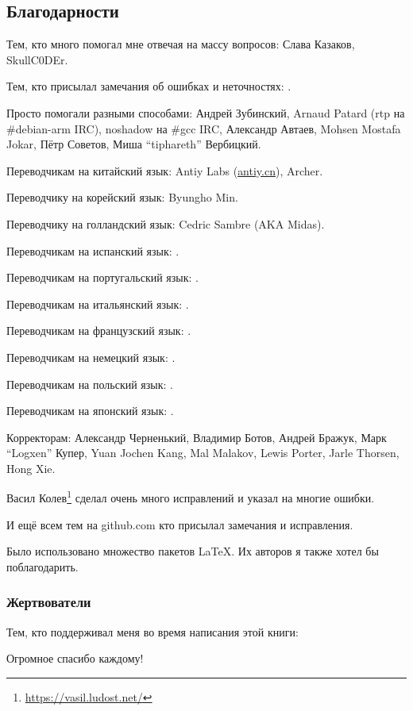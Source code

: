 \subsection*{Благодарности}

Тем, кто много помогал мне отвечая на массу вопросов: Слава  Казаков, SkullC0DEr.

Тем, кто присылал замечания об ошибках и неточностях: \PeopleMistakesInaccuracies{}.

Просто помогали разными способами:
Андрей Зубинский,
Arnaud Patard (rtp на \#debian-arm IRC),
noshadow на \#gcc IRC,
Александр Автаев,
Mohsen Mostafa Jokar,
Пётр Советов,
Миша ``tiphareth'' Вербицкий.

Переводчикам на китайский язык:
Antiy Labs (\href{http://antiy.cn}{antiy.cn}), Archer.

Переводчику на корейский язык: Byungho Min.

Переводчику на голландский язык: Cedric Sambre (AKA Midas).

Переводчикам на испанский язык: \PeopleSpanishTranslators{}.

Переводчикам на португальский язык: \PeoplePTBRTranslators{}.

Переводчикам на итальянский язык: \PeopleItalianTranslators{}.

Переводчикам на французский язык: \PeopleFrenchTranslators{}.

Переводчикам на немецкий язык: \PeopleGermanTranslators{}.

Переводчикам на польский язык: \PeoplePolishTranslators{}.

Переводчикам на японский язык: \PeopleJapaneseTranslators{}.

Корректорам:
Александр  Черненький,
Владимир Ботов,
Андрей Бражук,
Марк ``Logxen'' Купер, Yuan Jochen Kang, Mal Malakov, Lewis Porter, Jarle Thorsen, Hong Xie.

Васил Колев\footnote{\url{https://vasil.ludost.net/}} сделал очень много исправлений и указал на многие ошибки.

И ещё всем тем на github.com кто присылал замечания и исправления.

Было использовано множество пакетов \LaTeX. Их авторов я также хотел бы поблагодарить.

\subsubsection*{Жертвователи}

Тем, кто поддерживал меня во время написания этой книги:



Огромное спасибо каждому!

